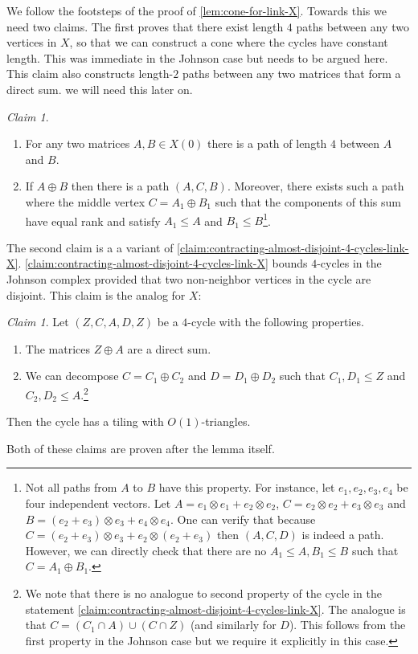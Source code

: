 \documentclass[10pt,a4paper]{article}
\newcommand{\prettyref}[1]{\cref{#1}}
\theoremstyle{definition}
\theoremstyle{remark}
\newtheorem{claim}[theorem]{Claim}
\renewcommand{\leq}{\leqslant}
\numberwithin{equation}{section}
\let\pref=\prettyref
\begin{document}
We follow the footsteps of the proof of \pref{lem:cone-for-link-X}. Towards this we need two claims. The first proves that there exist length \(4\) paths between any two vertices in \(X\), so that we can construct a cone where the cycles have constant length. This was immediate in the Johnson case but needs to be argued here. This claim also constructs length-$2$ paths between any two matrices that form a direct sum. we will need this later on.
    \begin{claim} \label{claim:louis-link-const-diam}
        \begin{enumerate}
            \item For any two matrices \(A,B \in X(0)\) there is a path of length \(4\) between \(A\) and \(B\).
            \item If \(A \oplus B\) then there is a path \((A,C,B)\). Moreover, there exists such a path where the middle vertex \(C = A_1 \oplus B_1\) such that the components of this sum have equal rank and satisfy \(A_1 \leq A\) and \(B_1 \leq B\)\footnote{Not all paths from \(A\) to \(B\) have this property. For instance, let \(e_1,e_2,e_3,e_4\) be four independent vectors. Let \(A=e_1 \otimes e_1 + e_2 \otimes e_2\), \(C = e_2 \otimes e_2 + e_3 \otimes e_3\) and \(B=(e_2 + e_3) \otimes e_3 + e_4 \otimes e_4\). One can verify that because \(C = (e_2+e_3) \otimes e_3 + e_2 \otimes (e_2 + e_3)\) then \((A,C,D)\) is indeed a path. However, we can directly check that there are no \(A_1 \leq A, B_1 \leq B\) such that \(C=A_1 \oplus B_1\).}.
        \end{enumerate} 
    \end{claim}
The second claim is a a variant of \pref{claim:contracting-almost-disjoint-4-cycles-link-X}. \pref{claim:contracting-almost-disjoint-4-cycles-link-X} bounds \(4\)-cycles in the Johnson complex provided that two non-neighbor vertices in the cycle are disjoint. This claim is the analog for \(X\):
\begin{claim} \label{claim:tiling-louis-special-cycles}
        Let \((Z,C,A,D,Z)\) be a \(4\)-cycle with the following properties.
    \begin{enumerate}
        \item The matrices \(Z \oplus A\) are a direct sum.
        \item We can decompose \(C=C_1 \oplus C_2\) and \(D=D_1 \oplus D_2\) such that \(C_1,D_1 \leq Z\) and \(C_2,D_2 \leq A\).\footnote{We note that there is no analogue to second property of the cycle in the statement \pref{claim:contracting-almost-disjoint-4-cycles-link-X}. The analogue is that \(C= (C_1 \cap A) \cup (C \cap Z)\) (and similarly for \(D\)). This follows from the first property in the Johnson case but we require it explicitly in this case.}
    \end{enumerate}
    Then the cycle has a tiling with \(O(1)\)-triangles.
    \end{claim}
Both of these claims are proven after the lemma itself.
\end{document}
